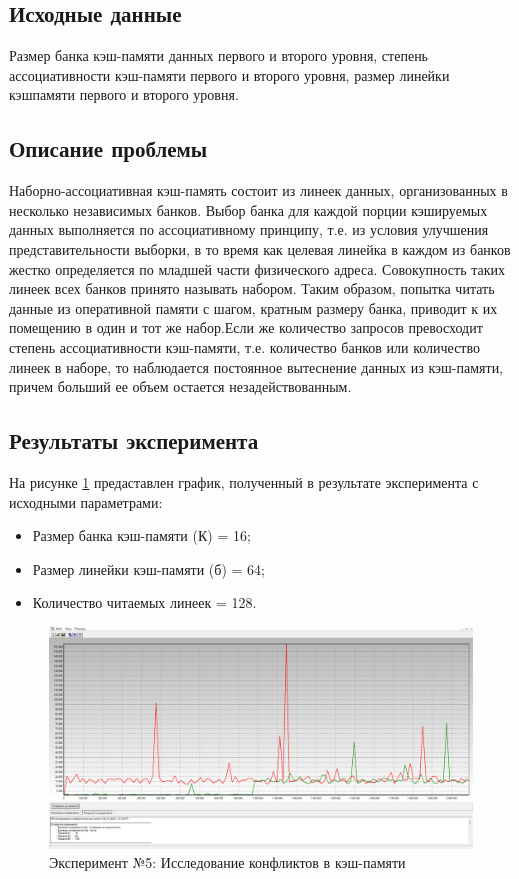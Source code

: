 \subsection*{Исходные данные}
Размер банка кэш-памяти данных первого и второго уровня, степень ассоциативности кэш-памяти первого и второго уровня, размер линейки кэшпамяти первого и второго уровня.

\subsection*{Описание проблемы}
Наборно-ассоциативная кэш-память состоит из линеек данных, организованных в несколько независимых банков. Выбор банка для каждой порции кэшируемых данных выполняется по ассоциативному принципу, т.е. из условия улучшения представительности выборки, в то время как целевая линейка в каждом из банков жестко определяется по младшей части физического адреса. Совокупность таких линеек всех банков принято называть набором. Таким образом, попытка читать данные из оперативной памяти с шагом, кратным размеру банка, приводит к их помещению в один и тот же набор.Если же количество запросов превосходит степень ассоциативности кэш-памяти, т.е. количество банков или количество линеек в наборе, то наблюдается постоянное вытеснение данных из кэш-памяти, причем больший ее объем остается незадействованным. 

\subsection*{Результаты эксперимента}
На рисунке \ref{ex:t5} предаставлен график, полученный в результате эксперимента с исходными параметрами:
\begin{itemize}
	\item Размер банка кэш-памяти (К) = 16;
	\item Размер линейки кэш-памяти (б) = 64;
	\item Количество читаемых линеек = 128.
\end{itemize}

\begin{figure}[h]
	\centering
	\includegraphics[height=0.35\textheight]{img/t5}
	\caption{Эксперимент №5: Исследование конфликтов в кэш-памяти}
	\label{ex:t5}
\end{figure}

